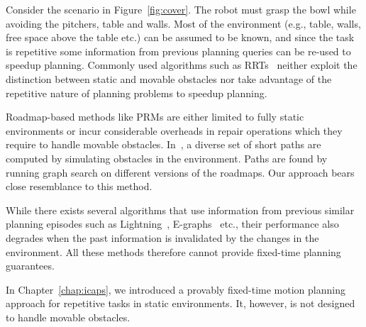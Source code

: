 \documentclass[a4paper]{report}
\begin{document}
Consider the scenario in Figure~\ref{fig:cover}. The robot must grasp the bowl while avoiding the pitchers, table and walls.
Most of the environment (e.g., table, walls, free space above the table etc.) can be assumed to be known, and since the task is repetitive some information from previous planning queries can be re-used to speedup planning.
Commonly used algorithms such as RRTs~\cite{kuffner2000rrt} neither exploit the distinction between static and movable obstacles nor take advantage of the repetitive nature of planning problems to speedup planning. 

Roadmap-based methods like PRMs are either limited to fully static environments or incur considerable overheads in repair operations which they require to handle movable obstacles.
In~\cite{voss2015heuristic}, a diverse set of short paths are computed by simulating obstacles in the environment. Paths are found by running graph search on different versions of the roadmaps. Our approach bears close resemblance to this method.

While there exists several algorithms that use information from previous similar planning episodes such as Lightning~\cite{berenson2012robot}, E-graphs~\cite{Phillips-RSS-12} etc., their performance also degrades when the past information is invalidated by the changes in the environment. All these methods therefore cannot provide fixed-time planning guarantees. 

In Chapter~\ref{chap:icaps}, we introduced a provably fixed-time motion planning approach for repetitive tasks in static environments. It, however, is not designed to handle movable obstacles.
\end{document}
